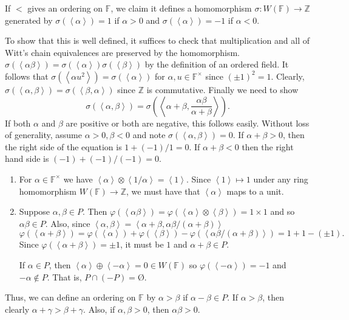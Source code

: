 \documentclass[12 pt, letterpaper]{hmcpset}
\begin{document}
\begin{solution}
	If $<$ gives an ordering on $\mathbb{F}$, we claim it defines a homomorphism $\sigma : W(\mathbb{F}) \to \mathbb{Z}$ generated by  $\sigma(\left < \alpha \right >) = 1$ if $\alpha > 0$ and $\sigma(\left < \alpha \right >) = -1$ if $\alpha < 0$. 

	To show that this is well defined, it suffices to check that multiplication and all of Witt's chain equivalences are preserved by the homomorphism. $\sigma(\left < \alpha \beta \right >) = \sigma(\left < \alpha \right >) \sigma(\left < \beta \right >)$ by the definition of an ordered field. It follows that $\sigma(\left < \alpha u^{2} \right >) = \sigma(\left < \alpha \right >)$ for $\alpha, u \in \mathbb{F}^{\times}$ since $(\pm 1)^{2} = 1$. Clearly, $\sigma(\left < \alpha, \beta \right >) = \sigma(\left < \beta, \alpha \right >)$ since $\mathbb{Z}$ is commutative. Finally we need to show
	 \[
		\sigma \left ( \left < \alpha, \beta \right > \right ) = \sigma  \left ( \left < \alpha + \beta, \frac{\alpha \beta}{\alpha + \beta} \right > \right ).
	\]
	If both $\alpha$ and $\beta$ are positive or both are negative, this follows easily. Without loss of generality, assume $\alpha > 0, \beta < 0$ and note $\sigma(\left < \alpha, \beta \right >) = 0$. If $\alpha + \beta > 0$, then the right side of the equation is $1 + (-1) / 1 = 0$. If $\alpha + \beta < 0 $ then the right hand side is $(-1) + (-1) / (-1) = 0$.

	\begin{enumerate}
		\item For $\alpha \in \mathbb{F}^{\times}$ we have $\left < \alpha \right > \otimes \left < 1 / \alpha \right > = \left < 1 \right >$. Since $\left < 1 \right > \mapsto 1$ under any ring homomorphism $W(\mathbb{F}) \to \mathbb{Z}$, we must have that $\left < \alpha \right >$ maps to a unit.

		\item Suppose $\alpha, \beta \in P$. Then $\varphi(\left < \alpha \beta \right >) = \varphi( \left < \alpha \right > \otimes \left < \beta \right >) = 1 \times 1$ and so $\alpha \beta \in P$. Also, since $\left < \alpha, \beta \right > = \left < \alpha + \beta, \alpha \beta / (\alpha + \beta) \right >$
			\[
				\varphi(\left < \alpha + \beta \right >) = \varphi(\left < \alpha \right >) + \varphi(\left < \beta \right >) - \varphi(\left < \alpha \beta / (\alpha + \beta) \right >) = 1 + 1 - (\pm 1).
			\]
			Since $\varphi(\left < \alpha + \beta \right >) = \pm 1$, it must be $1$ and $\alpha + \beta \in P$.

			If $\alpha \in P$, then $\left < \alpha \right > \oplus \left < -\alpha \right > = 0 \in W(\mathbb{F})$ so $\varphi(\left < -\alpha \right >) = -1$ and $-\alpha \notin P$. That is, $P \cap (-P) = \text{\O}$.
	\end{enumerate}

	Thus, we can define an ordering on $\mathbb{F}$ by  $\alpha > \beta$ if $\alpha - \beta \in P$. If $\alpha > \beta$, then clearly $\alpha + \gamma > \beta + \gamma$. Also, if $\alpha, \beta > 0$, then  $\alpha \beta > 0$.
\end{solution}
\end{document}
